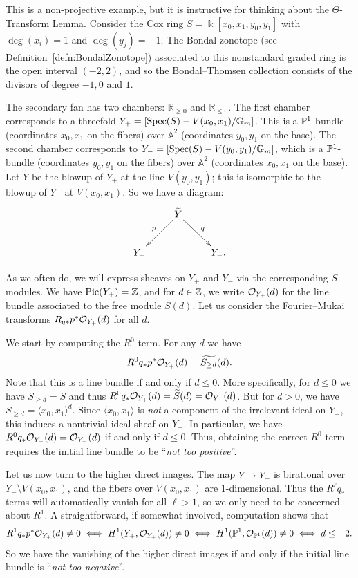 \documentclass{amsart}
\begin{document}
\begin{example}\label{ex:atiyahFlop}
This is a non-projective example, but it is instructive for thinking about the $\Theta$-Transform Lemma.  Consider the Cox ring $S=\Bbbk[x_0,x_1,y_0,y_1]$ with $\deg(x_i)=1$ and $\deg(y_j)=-1$.  The Bondal zonotope (see Definition~\ref{defn:BondalZonotope}) associated to this nonstandard graded ring is the open interval $(-2,2)$, and so the Bondal--Thomsen collection consists of the divisors of degree $-1,0$ and $1$.

The secondary fan has two chambers: $\mathbb R_{\geq 0}$ and $\mathbb R_{\leq 0}$.
The first chamber corresponds to a threefold $Y_+ =[\operatorname{Spec}(S) - V(x_0,x_1) / \mathbb G_m]$.  This is a $\mathbb P^1$-bundle (coordinates $x_0,x_1$ on the fibers) over $\mathbb A^2$ (coordinates $y_0,y_1$ on the base).  The second chamber corresponds to $Y_- =[\operatorname{Spec}(S) - V(y_0,y_1) / \mathbb G_m]$, which is a $\mathbb P^1$-bundle (coordinates $y_0,y_1$ on the fibers) over $\mathbb A^2$ (coordinates $x_0,x_1$ on the base).
Let $\widetilde{Y}$ be the blowup of $Y_+$ at the line $V(y_0,y_1)$; this is isomorphic to the blowup of $Y_-$ at $V(x_0,x_1)$.   So we have a diagram:
\[
\xymatrix{
&\widetilde{Y}\ar[ld]_{p}\ar[rd]^{q}&\\
Y_+&&Y_-.
}
\]

As we often do, we will express sheaves on $Y_+$ and $Y_-$ via the corresponding $S$-modules.
We have $\operatorname{Pic}(Y_+)=\mathbb Z$, and for $d\in \mathbb Z$, we write ${\mathcal O}_{Y_+}(d)$ for the line bundle associated to the free module $S(d)$.  Let us consider the Fourier--Mukai transforms $R_{q*}p^* {\mathcal O}_{Y_+}(d)$ for all $d$. 

We start by computing the $R^0$-term.  For any $d$ we have 
\[
R^0q_*p^*{\mathcal O}_{Y_+}(d) = \widetilde{S_{\geq d}}(d).
\]
Note that this is a line bundle if and only if $d\leq 0$.  More specifically, for $d\leq 0$ we have $S_{\geq d} = S$ and thus $R^0q_*{\mathcal O}_{Y_+}(d) = \widetilde{S}(d) = {\mathcal O}_{Y_-}(d)$.  But for $d>0$, we have $S_{\geq d} = \langle x_0,x_1\rangle^d$.  Since $\langle x_0,x_1\rangle$ is {\em not} a component of the irrelevant ideal on $Y_-$, this induces a nontrivial ideal sheaf on $Y_-$.   In particular, we have $R^0q_*{\mathcal O}_{Y_+}(d) = {\mathcal O}_{Y_-}(d)$ if and only if $d\leq 0$.  Thus, obtaining the correct $R^0$-term requires the initial line bundle to be ``{\em not too positive}''.

Let us now turn to the higher direct images.  The map $\widetilde{Y}\to Y_-$ is birational over $Y_- \setminus V(x_0,x_1)$, and the fibers over $V(x_0,x_1)$ are $1$-dimensional. Thus the $R^\ell q_*$ terms will automatically vanish for all $\ell > 1$, so we only need to be concerned about $R^1$.  A straightforward, if somewhat involved, computation shows that
\[
R^1q_*p^*{\mathcal O}_{Y_+}(d) \ne 0 \iff H^1(Y_+, {\mathcal O}_{Y_+}(d))\ne 0 \iff H^1(\mathbb P^1, {\mathcal O}_{\mathbb P^1}(d)) \ne 0 \iff d \le -2.
\]
So we have the vanishing of the higher direct images if and only if  the initial line bundle is ``{\em not too negative}''.


\end{example}
\end{document}
